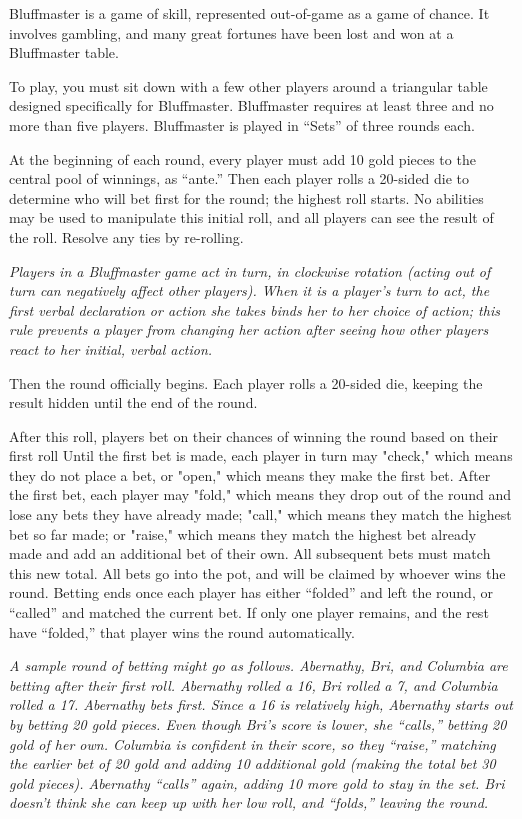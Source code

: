 \documentclass[green]{Kos}
\begin{document}
\name{\gBluffmaster{}}

Bluffmaster is a game of skill, represented out-of-game as a game of chance. It involves gambling, and many great fortunes have been lost and won at a Bluffmaster table.

To play, you must sit down with a few other players around a triangular table designed specifically for Bluffmaster. Bluffmaster requires at least three and no more than five players. Bluffmaster is played in “Sets” of three rounds each.

At the beginning of each round, every player must add 10 gold pieces to the central pool of winnings, as “ante.” Then each player rolls a 20-sided die to determine who will bet first for the round; the highest roll starts. No abilities may be used to manipulate this initial roll, and all players can see the result of the roll. Resolve any ties by re-rolling.

\emph{Players in a Bluffmaster game act in turn, in clockwise rotation (acting out of turn can negatively affect other players). When it is a player's turn to act, the first verbal declaration or action she takes binds her to her choice of action; this rule prevents a player from changing her action after seeing how other players react to her initial, verbal action.}

Then the round officially begins. Each player rolls a 20-sided die, keeping the result hidden until the end of the round. 

After this roll, players bet on their chances of winning the round based on their first roll Until the first bet is made, each player in turn may "check," which means they do not place a bet, or "open," which means they make the first bet. After the first bet, each player may "fold," which means they drop out of the round and lose any bets they have already made; "call," which means they match the highest bet so far made; or "raise," which means they match the highest bet already made and add an additional bet of their own. All subsequent bets must match this new total. All bets go into the pot, and will be claimed by whoever wins the round. Betting ends once each player has either “folded” and left the round, or “called” and matched the current bet. If only one player remains, and the rest have “folded,” that player wins the round automatically.

\emph{A sample round of betting might go as follows. Abernathy, Bri, and Columbia are betting after their first roll. Abernathy rolled a 16, Bri rolled a 7, and Columbia rolled a 17. Abernathy bets first. Since a 16 is relatively high, Abernathy starts out by betting 20 gold pieces. Even though Bri’s score is lower, she “calls,” betting 20 gold of her own. Columbia is confident in their score, so they “raise,” matching the earlier bet of 20 gold and adding 10 additional gold (making the total bet 30 gold pieces). Abernathy “calls” again, adding 10 more gold to stay in the set. Bri doesn’t think she can keep up with her low roll, and “folds,” leaving the round.}
\end{document}
